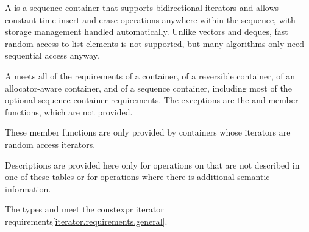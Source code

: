 \pnum
{}%
A
is a sequence container that supports
bidirectional iterators and allows constant time insert and erase
operations anywhere within the sequence, with storage management handled
automatically. Unlike vectors and deques,
fast random access to list elements is not supported, but many
algorithms only need sequential access anyway.

\pnum
A  meets all of the requirements
of a container,
of a reversible container,
of an allocator-aware container, and
of a sequence container,
including most of the optional sequence container
requirements.
The exceptions are the
and
member functions, which are not provided.
\begin{footnote}
These member functions
are only provided by containers whose iterators
are random access iterators.
\end{footnote}
Descriptions are provided here only for operations on
that are not described in one of these tables
or for operations where there is additional semantic information.

\pnum
The types  and  meet
the constexpr iterator requirements\ref{iterator.requirements.general}.

